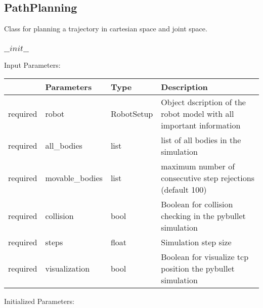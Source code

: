 \documentclass[
	ngerman,
	accentcolor=9c,%
	type=intern,
	marginpar=false
	]{tudapub}
\begin{document}
\subsection{PathPlanning}
\noindent Class for planning a trajectory in cartesian space and joint space.

\vspace{0.5cm}

\subsubsection{$\_\_init\_\_$}
\noindent Input Parameters:
\vspace{0.5cm}

\begin{tabular}{|p{}|p{}|p{}| p{}|}
\hline
 & \textbf{Parameters} & \textbf{Type} & \textbf{Description} \\
\hline
required & robot & RobotSetup & Object dscription of the robot model with all important information \\
\hline
required & all\_bodies & list & list of all bodies in the simulation \\
\hline
required & movable\_bodies & list & maximum number of consecutive step rejections (default 100) \\
\hline
required & collision & bool & Boolean for collision checking in the pybullet simulation \\
\hline
required & steps & float & Simulation step size \\
\hline
required & visualization & bool & Boolean for visualize tcp position the pybullet simulation \\
\hline
\end{tabular}
\vspace{0.5cm}


\noindent Initialized Parameters:
\end{document}
